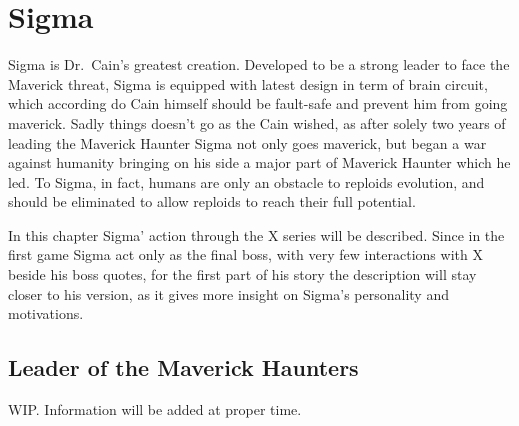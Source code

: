 \chapter{Sigma}\label{char:Sigma}
Sigma is Dr.~Cain's greatest creation. Developed to be a strong leader to face the Maverick threat, Sigma is equipped with latest design in term of brain circuit, which according do Cain himself should be fault-safe and prevent him from going maverick. Sadly things doesn't go as the Cain wished, as after solely two years of leading the Maverick Haunter Sigma not only goes maverick, but began a war against humanity bringing on his side a major part of Maverick Haunter which he led. To Sigma, in fact, humans are only an obstacle to reploids evolution, and should be eliminated to allow reploids to reach their full potential. 

In this chapter Sigma' action through the X series will be described. Since in the first game Sigma act only as the final boss, with very few interactions with X beside his boss quotes, for the first part of his story the description will stay closer to his \mhx version, as it gives more insight on Sigma's personality and motivations.

\section{Leader of the Maverick Haunters}
WIP. Information will be added at proper time.

